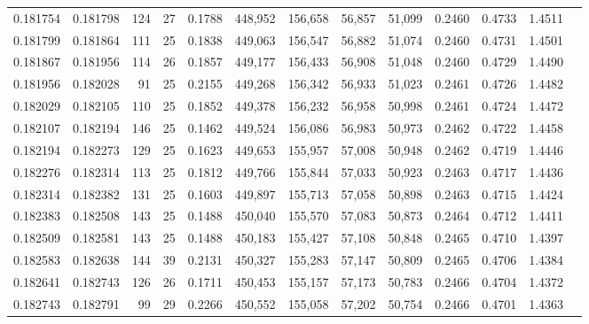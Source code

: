 \begin{tabular}{rrrrrrrrrrrrr}
0.181754 & 0.181798 & 124 &  27 &                                     0.1788 & 448,952 & 156,658 &  56,857 &  51,099 & 0.2460 & 0.4733 & 1.4511 \\
0.181799 & 0.181864 & 111 &  25 &                                     0.1838 & 449,063 & 156,547 &  56,882 &  51,074 & 0.2460 & 0.4731 & 1.4501 \\
0.181867 & 0.181956 & 114 &  26 &                                     0.1857 & 449,177 & 156,433 &  56,908 &  51,048 & 0.2460 & 0.4729 & 1.4490 \\
0.181956 & 0.182028 &  91 &  25 &                                     0.2155 & 449,268 & 156,342 &  56,933 &  51,023 & 0.2461 & 0.4726 & 1.4482 \\
0.182029 & 0.182105 & 110 &  25 &                                     0.1852 & 449,378 & 156,232 &  56,958 &  50,998 & 0.2461 & 0.4724 & 1.4472 \\
0.182107 & 0.182194 & 146 &  25 &                                     0.1462 & 449,524 & 156,086 &  56,983 &  50,973 & 0.2462 & 0.4722 & 1.4458 \\
0.182194 & 0.182273 & 129 &  25 &                                     0.1623 & 449,653 & 155,957 &  57,008 &  50,948 & 0.2462 & 0.4719 & 1.4446 \\
0.182276 & 0.182314 & 113 &  25 &                                     0.1812 & 449,766 & 155,844 &  57,033 &  50,923 & 0.2463 & 0.4717 & 1.4436 \\
0.182314 & 0.182382 & 131 &  25 &                                     0.1603 & 449,897 & 155,713 &  57,058 &  50,898 & 0.2463 & 0.4715 & 1.4424 \\
0.182383 & 0.182508 & 143 &  25 &                                     0.1488 & 450,040 & 155,570 &  57,083 &  50,873 & 0.2464 & 0.4712 & 1.4411 \\
0.182509 & 0.182581 & 143 &  25 &                                     0.1488 & 450,183 & 155,427 &  57,108 &  50,848 & 0.2465 & 0.4710 & 1.4397 \\
0.182583 & 0.182638 & 144 &  39 &                                     0.2131 & 450,327 & 155,283 &  57,147 &  50,809 & 0.2465 & 0.4706 & 1.4384 \\
0.182641 & 0.182743 & 126 &  26 &                                     0.1711 & 450,453 & 155,157 &  57,173 &  50,783 & 0.2466 & 0.4704 & 1.4372 \\
0.182743 & 0.182791 &  99 &  29 &                                     0.2266 & 450,552 & 155,058 &  57,202 &  50,754 & 0.2466 & 0.4701 & 1.4363 \\

\end{tabular}
